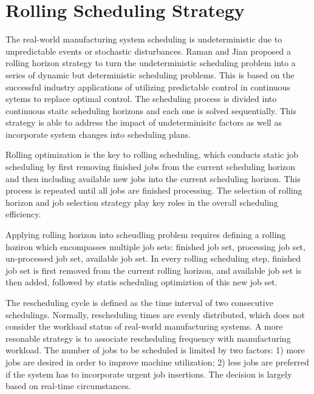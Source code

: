 \section{Rolling Scheduling Strategy}
The real-world manufacturing system scheduling is undeterministic due to unpredictable events or stochastic disturbances.
Raman \citep{raman19933} and Jian\citep{jian19972} proposed a rolling horizon strategy to turn the undeterministic scheduling problem into a series of dynamic but deterministic scheduling problems.
This is based on the successful industry applications of utilizing predictable control in continuous sytems to replace optimal control.
The scheduling process is divided into continuous staitc scheduling horizons and each one is solved sequentially.
This strategy is able to address the impact of undeterminisitc factors as well as incorporate system changes into scheduling plans.

Rolling optimization is the key to rolling scheduling, which conducts static job scheduling by first removing finished jobs from the current scheduling horizon and then including available new jobs into the current scheduling horizon.
This process is repeated until all jobs are finished processing.
The selection of rolling horizon and job selection strategy play key roles in the overall scheduling efficiency.

Applying rolling horizon into scheudling problem requires defining a rolling hoziron which encompasses multiple job sets: finished job set, processing job set, un-processed job set, available job set.
In every rolling scheduling step, finished job set is first removed from the current rolling horizon, and available job set is then added, followed by statis scheduling optimiztion of this new job set.

The rescheduling cycle is defined as the time interval of two consecutive schedulings.
Normally, rescheduling times are evenly distributed, which does not consider the workload status of real-world manufacturing systems.
A more resonable strategy is to associate rescheduling frequency with manufacturing workload.
The number of jobs to be scheduled is limited by two factors: 1) more jobs are desired in order to improve machine utilization; 2) less jobs are preferred if the system has to incorporate urgent job insertions.
The decision is largely based on real-time circumstances.

